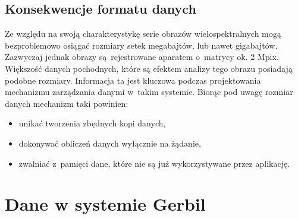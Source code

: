 \subsection{Konsekwencje formatu danych}
Ze względu na swoją charakterystykę serie obrazów wielospektralnych mogą bezproblemowo osiągać rozmiary setek megabajtów, lub nawet gigabajtów. Zazwyczaj jednak obrazy są rejestrowane aparatem o~matrycy ok. 2 Mpix. Większość danych pochodnych, które są efektem analizy tego obrazu posiadają podobne rozmiary. Informacja ta jest kluczowa podczas projektowania mechanizmu zarządzania danymi w~takim systemie. Biorąc pod uwagę rozmiar danych mechanizm taki powinien:
\begin{itemize}
\item unikać tworzenia zbędnych kopi danych,
\item dokonywać obliczeń danych wyłącznie na żądanie,
\item zwalniać z~pamięci dane, które nie są już wykorzystywane przez aplikację.
\end{itemize}

\section{Dane w systemie Gerbil}

